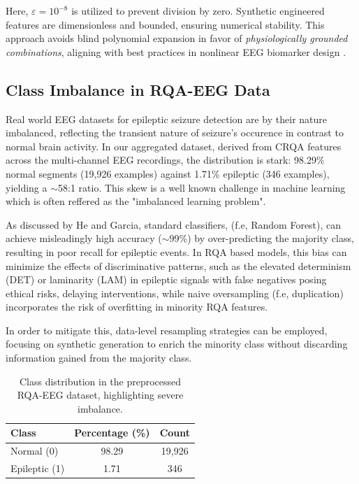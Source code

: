 \documentclass{article}
\begin{document}
				Here, $\varepsilon = 10^{-8}$ is utilized to prevent division by zero. 
				Synthetic engineered features are dimensionless and 
				bounded, ensuring numerical stability. 
				This approach avoids blind polynomial expansion in 
				favor of \textit{physiologically grounded combinations}, 
				aligning with best practices in nonlinear EEG biomarker design \cite{faes2014information, zhang2020cross}.



				\subsection{Class Imbalance in RQA-EEG Data}

				Real world EEG datasets for epileptic seizure detection are by their nature imbalanced, 
				reflecting the transient nature of seizure's occurence in contrast to normal brain activity. 
				In our aggregated dataset, derived from CRQA features across the multi-channel EEG recordings,
				the distribution is stark: 98.29\% normal segments (19,926 examples) against 1.71\% epileptic (346 examples), 
				yielding a $\sim$58:1 ratio. This skew is a well known challenge in machine 
				learning which is often reffered as the "imbalanced learning problem".

				As discussed by He and Garcia\cite{he2009}, standard classifiers, (f.e, Random Forest), 
				can achieve misleadingly high accuracy ($\sim$99\%) 
				by over-predicting the majority class, resulting in poor recall for epileptic events.
				In RQA based models, this bias can minimize the effects of discriminative patterns, 
				such as the elevated determinism (DET) or laminarity (LAM) in epileptic signals with 
				false negatives posing ethical risks, delaying interventions, while naive oversampling 
				(f.e, duplication) incorporates the risk of overfitting in minority RQA features.

				In order to mitigate this, data-level resampling strategies can be employed, focusing on 
				synthetic generation to enrich the minority class without discarding information gained from
				the majority class. 

				\begin{table}[h]
				\centering
				\caption{Class distribution in the preprocessed RQA-EEG dataset, highlighting severe imbalance.}
				\label{tab:imbalance}
				\begin{tabular}{lcc}
				\toprule
				Class & Percentage (\%) & Count \\
				\midrule
				Normal (0) & 98.29 & 19,926 \\
				Epileptic (1) & 1.71 & 346 \\
				\bottomrule
				\end{tabular}
				\end{table}
				
\end{document}
